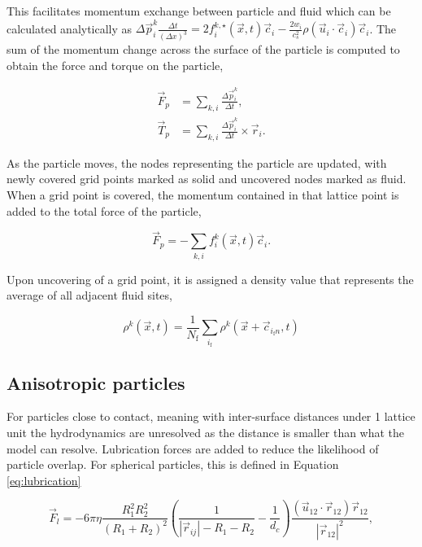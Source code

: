 This facilitates momentum exchange between particle and fluid which can be calculated analytically as 
\(\Delta\vec{p}^k_i \frac{\Delta t}{(\Delta x)^3} = 2 f^{k,\star}_i(\vec{x},t)\vec{c}_i - \frac{2w_i}{c_s^2}\rho(\vec{u}_i\cdot\vec{c}_i)\vec{c}_i\).
The sum of the momentum change across the surface of the particle is computed to obtain the force and torque on the particle,

\begin{equation}
    \begin{split}
    \vec{F}_p &= \sum_{k,i} \frac{\Delta \vec{p}^k_i}{\Delta t} , \\
    \vec{T}_p &= \sum_{k,i} \frac{\Delta\vec{p}^k_i}{\Delta t} \times \vec{r}_i .
    \end{split}
\end{equation}

As the particle moves, the nodes representing the particle are updated, with newly covered grid points marked as solid and 
uncovered nodes marked as fluid. When a grid point is covered, the momentum contained in that lattice point is added to the 
total force of the particle,

\begin{equation}
    \vec{F}_p = -\sum_{k,i} f_i^k(\vec{x},t)\vec{c}_i .
\end{equation}

Upon uncovering of a grid point, it is assigned a density value that represents the average of all adjacent fluid sites,

\begin{equation}
    \rho^k(\vec{x},t) = \frac{1}{N_{\text{f}}} \sum_{i_{\text{f}}} \rho^k(\vec{x}+\vec{c}_{i_{\text{f}}n}, t)
    \label{eq:fill_particles}
\end{equation}

\subsection{Anisotropic particles}
\label{section:lbm_colloids_ellipsoids}

For particles close to contact, meaning with inter-surface distances under 1 lattice unit the hydrodynamics are unresolved as the
distance is smaller than what the model can resolve. Lubrication forces are added to reduce the likelihood of particle overlap. For 
spherical particles, this is defined in Equation \eqref{eq:lubrication}

\begin{equation}
    \vec{F}_l = -6 \pi \eta \frac{R_1^2 R_2^2}{\left(R_1+R_2\right)^2}\left(\frac{1}{|\vec{r}_{ij}|-R_1-R_2}-\frac{1}{d_c}\right) \frac{\left(\vec{u}_{12}\cdot\vec{r}_{12}\right)\vec{r}_{12}}{|\vec{r}_{12}|^2} ,%
    \label{eq:lubrication}
\end{equation}


